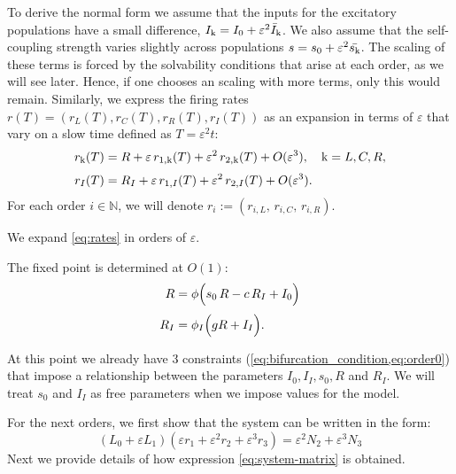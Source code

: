 \documentclass[../main.tex]{subfiles}
\begin{document}
To derive the normal form we assume that the inputs for the excitatory populations have a small difference,  $I_{\mathrm{k}}  = I_0 + \varepsilon^2\bar{I}_{\mathrm{k}} $. We also assume that the self-coupling strength varies slightly across populations $s = s_0 +\varepsilon^2 \bar{s_{\mathrm{k}}}$. The scaling of these terms is forced by the solvability conditions that arise at each order, as we will see later. Hence, if one chooses an scaling with more terms, only this would remain. 
Similarly, we express the firing rates  $r(T) = (r_L(T),r_C(T),r_R(T), r_I(T))$ as an expansion in terms of $\varepsilon$ that vary on a slow time defined as $T = \varepsilon^2 t$:
\begin{subequations}
\label{eq:exp}
\begin{align}
  r_{\mathrm{k}} (T) &= R + \varepsilon\,r_{1,\mathrm{k} }(T) + \varepsilon^2\,r_{2,\mathrm{k} }(T) + O(\varepsilon^3), \quad \mathrm{k} =L,C,R, \label{eq:exp_ex}\\[1mm]
  r_I(T) &= R_I + \varepsilon\,r_{1,I}(T) + \varepsilon^2\,r_{2,I}(T) + O(\varepsilon^3). \label{eq:exp_inh}
\end{align}
\end{subequations}
For each order $i \in \mathbb{N}$, we will denote $r_i := (r_{i,L},\, r_{i,C},\,r_{i,R})$.

We expand \eqref{eq:rates} in orders of $\varepsilon$.

The fixed point is determined at \(O(1)\):
\begin{equation}
\begin{aligned}
  R &= \phi\Bigl(s_0\,R - c\,R_I + I_0  \Bigr)
  \\[1mm]
  R_I &= \phi_I\Bigl({g}R+I_I\Bigr). \label{eq:order0}
\end{aligned}
\end{equation}

At this point we already have 3 constraints (\cref{eq:bifurcation_condition,eq:order0}) that impose a relationship between the parameters $I_0, I_I, s_0, R$ and $R_I$.
We will treat $s_0$ and $I_I$ as free parameters when we impose values for the model.
\bigskip

For the next orders, we first show that the system can be written in the form:
\begin{equation}
(L_0 + \varepsilon L_1)(\varepsilon r_1 + \varepsilon^2 r_2 + \varepsilon^3 r_3) = \varepsilon^2N_2 + \varepsilon^3N_3
\label{eq:system-matrix}
\end{equation}
Next we provide details of how expression \eqref{eq:system-matrix} is obtained.
\end{document}
